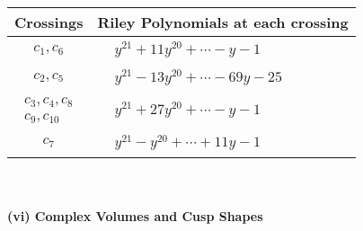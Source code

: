 \documentclass[1p]{elsarticle_modified}
\theoremstyle{definition}
\begin{document}
\begin{tabular}{m{50pt}|m{274pt}}
Crossings & \hspace{64pt}Riley Polynomials at each crossing \\
\hline $$\begin{aligned}c_{1},c_{6}\end{aligned}$$&$\begin{aligned}
&y^{21}+11 y^{20}+\cdots- y-1
\end{aligned}$\\
\hline $$\begin{aligned}c_{2},c_{5}\end{aligned}$$&$\begin{aligned}
&y^{21}-13 y^{20}+\cdots-69 y-25
\end{aligned}$\\
\hline $$\begin{aligned}c_{3},c_{4},c_{8}\\c_{9},c_{10}\end{aligned}$$&$\begin{aligned}
&y^{21}+27 y^{20}+\cdots- y-1
\end{aligned}$\\
\hline $$\begin{aligned}c_{7}\end{aligned}$$&$\begin{aligned}
&y^{21}- y^{20}+\cdots+11 y-1
\end{aligned}$\\
\hline
\end{tabular}\\~\\
\newpage\flushleft \textbf{(vi) Complex Volumes and Cusp Shapes}
\end{document}
